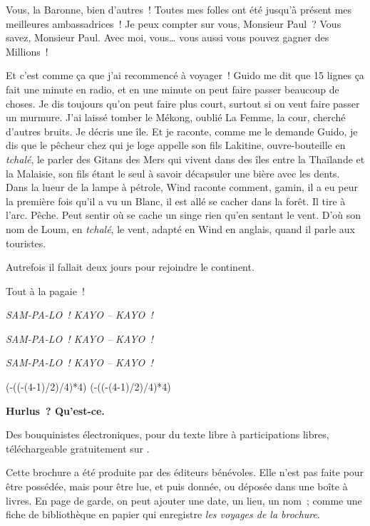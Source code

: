 \documentclass[french,twoside]{book} %
\def\truncdiv#1#2{((#1-(#2-1)/2)/#2)}
\def\moduloop#1#2{(#1-\truncdiv{#1}{#2}*#2)}
\def\modulo#1#2{\number\numexpr\moduloop{#1}{#2}\relax}
\begin{document}
Vous, la Baronne, bien d’autres ! Toutes mes folles ont été jusqu’à présent mes meilleures ambassadrices ! Je peux compter sur vous, Monsieur Paul ? Vous savez, Monsieur Paul. Avec moi, vous… vous aussi vous pouvez gagner des Millions !\par
\bigbreak
\noindent Et c’est comme ça que j’ai recommencé à voyager ! Guido me dit que 15 lignes ça fait une minute en radio, et en une minute on peut faire passer beaucoup de choses. Je dis toujours qu’on peut faire plus court, surtout si on veut faire passer un murmure. J’ai laissé tomber le Mékong, oublié La Femme, la cour, cherché d’autres bruits. Je décris une île. Et je raconte, comme me le demande Guido, je dis que le pêcheur chez qui je loge appelle son fils Lakitine, ouvre-bouteille en\emph{ tchalé}, le parler des Gitans des Mers qui vivent dans des îles entre la Thaïlande et la Malaisie, son fils étant le seul à savoir décapsuler une bière avec les dents. Dans la lueur de la lampe à pétrole, Wind raconte comment, gamin, il a eu peur la première fois qu’il a vu un Blanc, il est allé se cacher dans la forêt. Il tire à l’arc. Pêche. Peut sentir où se cache un singe rien qu’en sentant le vent. D’où son nom de Loum, en \emph{tchalé}, le vent, adapté en Wind en anglais, quand il parle aux touristes.\par
Autrefois il fallait deux jours pour rejoindre le continent.\par
Tout à la pagaie !\par
\bigbreak
{\centering\itshape SAM-PA-LO ! KAYO – KAYO !\par}
{\centering\itshape \noindent SAM-PA-LO ! KAYO – KAYO !\par}
{\centering\itshape \noindent SAM-PA-LO ! KAYO – KAYO !\par}
 


\ifbooklet
  \pagestyle{empty}
  \clearpage
  \ifnum\modulo{\value{page}}{4}=0 \hbox{}\newpage\hbox{}\newpage\fi
  \ifnum\modulo{\value{page}}{4}=1 \hbox{}\newpage\hbox{}\newpage\fi


  \hbox{}\newpage
  \ifodd\value{page}\hbox{}\newpage\fi
  {\centering\color{rubric}\bfseries\noindent\large
    Hurlus ? Qu’est-ce.\par
    \bigskip
  }
  \noindent Des bouquinistes électroniques, pour du texte libre à participations libres,
  téléchargeable gratuitement sur \href{https://hurlus.fr}{}.\par
  \bigskip
  \noindent Cette brochure a été produite par des éditeurs bénévoles.
  Elle n’est pas faite pour être possédée, mais pour être lue, et puis donnée, ou déposée dans une boîte à livres.
  En page de garde, on peut ajouter une date, un lieu, un nom ;
  comme une fiche de bibliothèque en papier qui enregistre \emph{les voyages de la brochure}.
  \par
\end{document}
